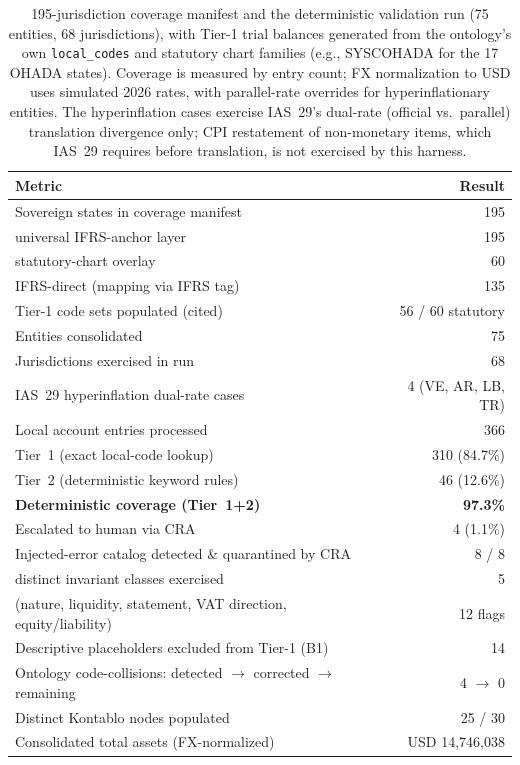 \begin{table}[htbp]
\centering
\small
\begin{tabular}{l r}
\hline
\textbf{Metric} & \textbf{Result} \\ \hline
Sovereign states in coverage manifest & 195 \\
\quad universal IFRS-anchor layer & 195 \\
\quad statutory-chart overlay & 60 \\
\quad IFRS-direct (mapping via IFRS tag) & 135 \\
\quad Tier-1 code sets populated (cited) & 56 / 60 statutory \\
\hline
Entities consolidated & 75 \\
Jurisdictions exercised in run & 68 \\
IAS~29 hyperinflation dual-rate cases & 4 (VE, AR, LB, TR) \\
Local account entries processed & 366 \\
\hline
Tier~1 (exact local-code lookup) & 310 \quad(84.7\%) \\
Tier~2 (deterministic keyword rules) & 46 \quad(12.6\%) \\
\textbf{Deterministic coverage (Tier~1+2)} & \textbf{97.3\%} \\
Escalated to human via CRA & 4 \quad(1.1\%) \\
\hline
Injected-error catalog detected \& quarantined by CRA & 8 / 8 \\
\quad distinct invariant classes exercised & 5 \\
\quad (nature, liquidity, statement, VAT direction, equity/liability) & 12 flags \\
Descriptive placeholders excluded from Tier-1 (B1) & 14 \\
Ontology code-collisions: detected $\to$ corrected $\to$ remaining & 4 $\to$ 0 \\
\hline
Distinct Kontablo nodes populated & 25 / 30 \\
Consolidated total assets (FX-normalized) & USD 14{,}746{,}038 \\
\hline
\end{tabular}
\caption{195-jurisdiction coverage manifest and the deterministic validation run
(75 entities, 68 jurisdictions), with Tier-1 trial balances generated from the
ontology's own \texttt{local\_codes} and statutory chart families (e.g.,
SYSCOHADA for the 17 OHADA states). Coverage is measured by entry count; FX
normalization to USD uses simulated 2026 rates, with parallel-rate overrides for
hyperinflationary entities. The hyperinflation cases exercise IAS~29's
dual-rate (official vs.\ parallel) translation divergence only; CPI restatement
of non-monetary items, which IAS~29 requires before translation, is not
exercised by this harness.}
\label{tab:expanded_validation}
\end{table}

